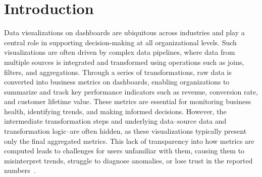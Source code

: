 
\section{Introduction} 
Data visualizations on dashboards are ubiquitous across industries and play a
central role in supporting decision-making at all organizational levels. Such
visualizations are often driven by complex data pipelines, where data from
multiple sources is integrated and transformed using operations such as joins,
filters, and aggregations. Through a series of transformations, raw data is
converted into business metrics on dashboards, enabling organizations to
summarize and track key performance indicators such as revenue, conversion rate,
and customer lifetime value. These metrics are essential for monitoring business
health, identifying trends, and making informed decisions. However, the
intermediate transformation steps and underlying data--source data and
transformation logic--are often hidden, as these visualizations typically
present only the final aggregated metrics. This lack of transparency into how
metrics are computed leads to challenges for users unfamiliar with them, causing them to misinterpret
trends, struggle to diagnose anomalies, or lose trust in the reported
numbers~\cite{matheus2020data}.

